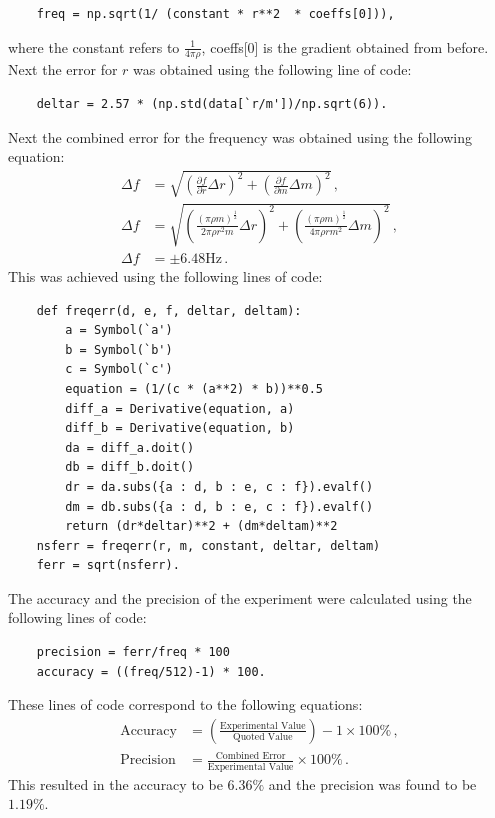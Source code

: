 \documentclass[12pt, a4paper]{article}
\begin{document}
\begin{verbatim}
    freq = np.sqrt(1/ (constant * r**2  * coeffs[0])),
\end{verbatim}
where the constant refers to $\frac{1}{4 \pi \rho}$, coeffs[0] is the gradient obtained from before. Next the error for $r$ was obtained using the following line of code:
\begin{verbatim}
    deltar = 2.57 * (np.std(data[`r/m'])/np.sqrt(6)).
\end{verbatim}
Next the combined error for the frequency was obtained using the following equation:
\begin{align} \label{eq: Combined error eq}
    \Delta f &= \sqrt{\left(\frac{\partial f}{\partial r}\Delta r \right)^2 + \left(\frac{\partial f}{\partial m} \Delta m \right)^2}\,,\\
    \nonumber \Delta f &=\sqrt{\left(\frac{(\pi \rho m)^{\frac{1}{2}}}{2\pi \rho r^2 m} \Delta r \right)^2 +\left(\frac{(\pi \rho m)^{\frac{1}{2}}}{4\pi \rho r m^2} \Delta m \right)^2}\,,\\
    \nonumber \Delta f &= \pm 6.48\text{Hz}\,.
\end{align}
This was achieved using the following lines of code:
\begin{verbatim}
    def freqerr(d, e, f, deltar, deltam):
        a = Symbol(`a')
        b = Symbol(`b')
        c = Symbol(`c')
        equation = (1/(c * (a**2) * b))**0.5
        diff_a = Derivative(equation, a)
        diff_b = Derivative(equation, b)
        da = diff_a.doit()
        db = diff_b.doit()
        dr = da.subs({a : d, b : e, c : f}).evalf()
        dm = db.subs({a : d, b : e, c : f}).evalf()
        return (dr*deltar)**2 + (dm*deltam)**2
    nsferr = freqerr(r, m, constant, deltar, deltam)
    ferr = sqrt(nsferr).
\end{verbatim}
The accuracy and the precision of the experiment were calculated using the following lines of code:
\begin{verbatim}
    precision = ferr/freq * 100 
    accuracy = ((freq/512)-1) * 100.
\end{verbatim}
These lines of code correspond to the following equations:
\begin{align}
    \text{Accuracy} &= \left(\frac{\text{Experimental Value}}{\text{Quoted Value}}\right)-1 \times 100 \% \,,\\
    \text{Precision} &= \frac{\text{Combined Error}}{\text{Experimental Value}} \times 100\%\,.
\end{align}
This resulted in the accuracy to be $6.36\%$ and the precision was found to be $1.19\%$.
\end{document}
